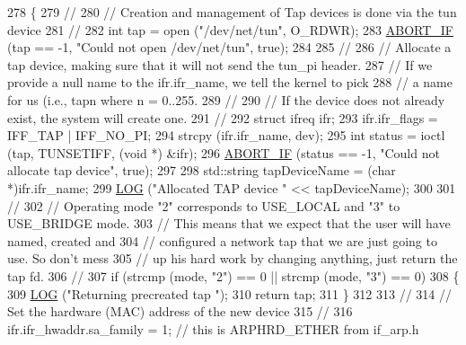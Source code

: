 \begin{DoxyCode}
278 \{
279   \textcolor{comment}{//}
280   \textcolor{comment}{// Creation and management of Tap devices is done via the tun device}
281   \textcolor{comment}{//}
282   \textcolor{keywordtype}{int} tap = open (\textcolor{stringliteral}{"/dev/net/tun"}, O\_RDWR);
283   \hyperlink{tap-creator_8cc_a91c11c90ad2f1672fbd3c031038dce16}{ABORT\_IF} (tap == -1, \textcolor{stringliteral}{"Could not open /dev/net/tun"}, \textcolor{keyword}{true});
284 
285   \textcolor{comment}{//}
286   \textcolor{comment}{// Allocate a tap device, making sure that it will not send the tun\_pi header.}
287   \textcolor{comment}{// If we provide a null name to the ifr.ifr\_name, we tell the kernel to pick}
288   \textcolor{comment}{// a name for us (i.e., tapn where n = 0..255.}
289   \textcolor{comment}{//}
290   \textcolor{comment}{// If the device does not already exist, the system will create one.}
291   \textcolor{comment}{//}
292   \textcolor{keyword}{struct }ifreq ifr;
293   ifr.ifr\_flags = IFF\_TAP | IFF\_NO\_PI;
294   strcpy (ifr.ifr\_name, dev);
295   \textcolor{keywordtype}{int} status = ioctl (tap, TUNSETIFF, (\textcolor{keywordtype}{void} *) &ifr);
296   \hyperlink{tap-creator_8cc_a91c11c90ad2f1672fbd3c031038dce16}{ABORT\_IF} (status == -1, \textcolor{stringliteral}{"Could not allocate tap device"}, \textcolor{keyword}{true});
297 
298   std::string tapDeviceName = (\textcolor{keywordtype}{char} *)ifr.ifr\_name;
299   \hyperlink{tap-creator_8cc_a158a8c64f24645c7478298399825737f}{LOG} (\textcolor{stringliteral}{"Allocated TAP device "} << tapDeviceName);
300 
301   \textcolor{comment}{//}
302   \textcolor{comment}{// Operating mode "2" corresponds to USE\_LOCAL and "3" to USE\_BRIDGE mode.}
303   \textcolor{comment}{// This means that we expect that the user will have named, created and }
304   \textcolor{comment}{// configured a network tap that we are just going to use.  So don't mess }
305   \textcolor{comment}{// up his hard work by changing anything, just return the tap fd.}
306   \textcolor{comment}{//}
307   \textcolor{keywordflow}{if} (strcmp (mode, \textcolor{stringliteral}{"2"}) == 0 || strcmp (mode, \textcolor{stringliteral}{"3"}) == 0)
308     \{
309       \hyperlink{tap-creator_8cc_a158a8c64f24645c7478298399825737f}{LOG} (\textcolor{stringliteral}{"Returning precreated tap "});
310       \textcolor{keywordflow}{return} tap;
311     \}
312 
313   \textcolor{comment}{//}
314   \textcolor{comment}{// Set the hardware (MAC) address of the new device}
315   \textcolor{comment}{//}
316   ifr.ifr\_hwaddr.sa\_family = 1; \textcolor{comment}{// this is ARPHRD\_ETHER from if\_arp.h}

\end{DoxyCode}
